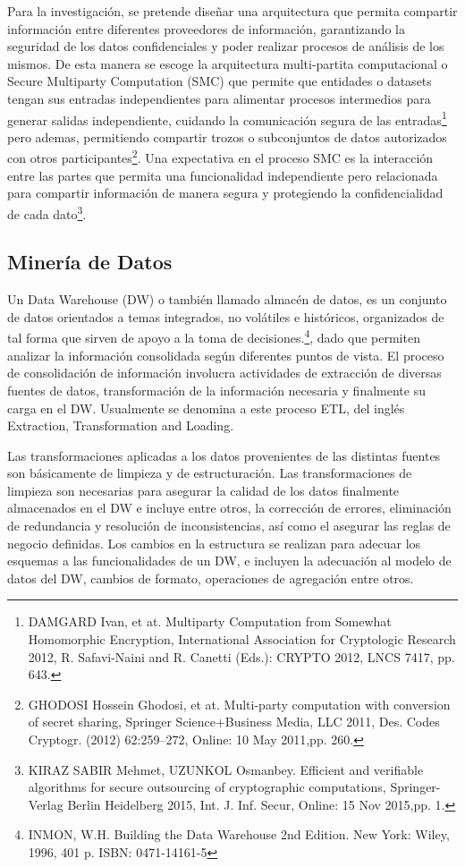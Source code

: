 \documentclass[a4paper,openright,12pt]{book}
\theoremstyle{definition}
\theoremstyle{remark}
\begin{document}
Para la investigación, se pretende diseñar una arquitectura que permita compartir información entre diferentes proveedores de información, garantizando la seguridad de los datos confidenciales y poder realizar procesos de análisis de los mismos. De esta manera se escoge la arquitectura multi-partita computacional o Secure Multiparty Computation (SMC) que permite que entidades o datasets tengan sus entradas independientes para alimentar procesos intermedios para generar salidas independiente, cuidando la comunicación segura de las entradas\footnote{DAMGARD Ivan, et at. Multiparty Computation from Somewhat Homomorphic Encryption, International Association for Cryptologic Research 2012, R. Safavi-Naini and R. Canetti (Eds.): CRYPTO 2012, LNCS 7417, pp. 643.} pero ademas, permitiendo compartir trozos o subconjuntos de datos autorizados con otros participantes\footnote{GHODOSI Hossein Ghodosi, et at. Multi-party computation with conversion of secret sharing, Springer Science+Business Media, LLC 2011, Des. Codes Cryptogr. (2012) 62:259–272, Online: 10 May 2011,pp. 260.}. Una expectativa en el proceso SMC es la interacción entre las partes que permita una funcionalidad independiente pero relacionada para compartir información de manera segura y protegiendo la confidencialidad de cada dato\footnote{KIRAZ SABIR Mehmet, UZUNKOL Osmanbey. Efficient and verifiable algorithms for secure outsourcing of cryptographic computations, Springer-Verlag Berlin Heidelberg 2015, Int. J. Inf. Secur, Online: 15 Nov 2015,pp. 1.}.

	\subsection{Minería de Datos}
Un Data Warehouse (DW) o también llamado almacén de datos, es un conjunto de datos orientados a temas integrados, no volátiles e históricos, organizados de tal forma que sirven de apoyo a la toma de decisiones.\footnote{INMON, W.H. Building the Data Warehouse 2nd Edition. New York: Wiley, 1996,
401 p. ISBN: 0471-14161-5}, dado que permiten analizar la información consolidada según diferentes puntos de vista. El proceso de consolidación de información involucra actividades
de extracción de diversas fuentes de datos, transformación de la información necesaria y finalmente su carga en el DW. Usualmente se denomina a este proceso ETL, del inglés Extraction, Transformation and Loading.

Las transformaciones aplicadas a los datos provenientes de las distintas fuentes son básicamente de limpieza y de estructuración. Las transformaciones de limpieza son necesarias para asegurar la calidad de los datos finalmente almacenados en el DW e
incluye entre otros, la corrección de errores, eliminación de redundancia y resolución de inconsistencias, así como el asegurar las reglas de negocio definidas. Los cambios en la estructura se realizan para adecuar los esquemas a las funcionalidades de un DW, e incluyen la adecuación al modelo de datos del DW, cambios de formato, operaciones de agregación entre otros.
\end{document}
